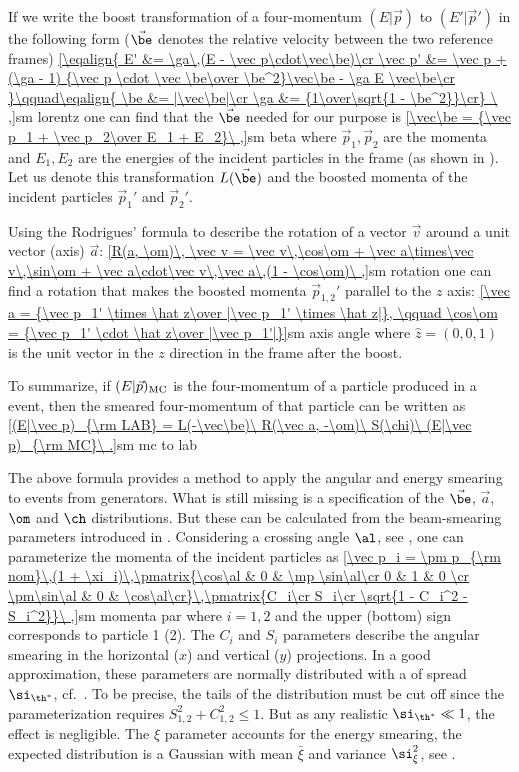If we write the boost transformation of a four-momentum $(E|\vec p)$ to $(E'|\vec p')$ in the following form ($\vec\be$ denotes the relative velocity between the two reference frames)
\eqref{\eqalign{
E'      &= \ga\,(E - \vec p\cdot\vec\be)\cr
\vec p' &= \vec p  +  (\ga - 1) {\vec p \cdot \vec \be\over \be^2}\vec\be - \ga E \vec\be\cr
}\qquad\eqalign{
\be &= |\vec\be|\cr
\ga &= {1\over\sqrt{1 - \be^2}}\cr}
\ ,}{sm lorentz}
one can find that the $\vec\be$ needed for our purpose is
\eqref{\vec\be = {\vec p_1 + \vec p_2\over E_1 + E_2}\ ,}{sm beta}
where $\vec p_1, \vec p_2$ are the momenta and $E_1, E_2$ are the energies of the incident particles in the  frame (as shown in ). Let us denote this transformation $L(\vec\be)$ and the boosted momenta of the incident particles $\vec p_1'$ and $\vec p_2'$.

Using the Rodrigues' formula to describe the rotation of a vector $\vec v$ around a unit vector (axis) $\vec a$:
\eqref{R(a, \om)\, \vec v = \vec v\,\cos\om + \vec a\times\vec v\,\sin\om + \vec a\cdot\vec v\,\vec a\,(1 - \cos\om)\ ,}{sm rotation}
one can find a rotation that makes the boosted momenta $\vec p_{1, 2}'$ parallel to the $z$ axis:
\eqref{\vec a = {\vec p_1' \times \hat z\over |\vec p_1' \times \hat z|}, \qquad \cos\om = {\vec p_1' \cdot \hat z\over |\vec p_1'|}}{sm axis angle}
where $\hat z = (0, 0, 1)$ is the unit vector in the $z$ direction in the frame after the boost.

To summarize, if $(E|\vec p)_{\rm MC}$ is the four-momentum of a particle produced in a  event, then the smeared  four-momentum of that particle can be written as
\eqref{(E|\vec p)_{\rm LAB} = L(-\vec\be)\ R(\vec a, -\om)\ S(\chi)\ (E|\vec p)_{\rm MC}\ .}{sm mc to lab}


The above formula provides a method to apply the angular and energy smearing to events from  generators. What is still missing is a specification of the $\vec\be$, $\vec a$, $\om$ and $\ch$ distributions. But these can be calculated from the beam-smearing parameters introduced in . Considering a crossing angle $\al$, see , one can parameterize the momenta of the incident particles as
\eqref{\vec p_i = \pm p_{\rm nom}\,(1 + \xi_i)\,\pmatrix{\cos\al & 0 & \mp \sin\al\cr 0 & 1 & 0 \cr \pm\sin\al & 0 & \cos\al\cr}\,\pmatrix{C_i\cr S_i\cr \sqrt{1 - C_i^2 - S_i^2}}\ ,}{sm momenta par}
where $i = 1, 2$ and the upper (bottom) sign corresponds to particle 1 (2). The $C_i$ and $S_i$ parameters describe the angular smearing in the horizontal ($x$) and vertical ($y$) projections. In a good approximation, these parameters are normally distributed with a of spread $\si_{\th^*}$, cf.~. To be precise, the tails of the distribution must be cut off since the parameterization requires $S_{1,2}^2 + C_{1,2}^2 \leq 1$. But as any realistic $\si_{\th^*} \ll 1$, the effect is negligible. The $\xi$ parameter accounts for the energy smearing, the expected distribution is a Gaussian with mean $\bar\xi$ and variance $\si_\xi^2$, see .

